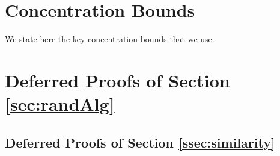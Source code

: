 \section{Concentration Bounds}
We state here the key concentration bounds that we use.




\section{Deferred Proofs of Section \ref{sec:randAlg}}

\subsection{Deferred Proofs of Section \ref{ssec:similarity}}
\label{app:similarity}

